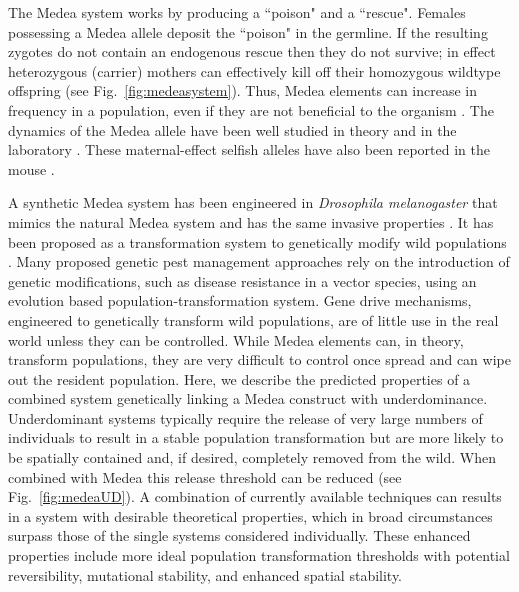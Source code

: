 \documentclass[oneside,11pt,a4paper]{book}
\begin{document}
%
The Medea system works by producing a ``poison" and a ``rescue".
Females possessing a Medea allele deposit the ``poison" in the germline.
If the resulting zygotes do not contain an endogenous rescue then they do not survive; in effect heterozygous (carrier) mothers can effectively kill off their homozygous wildtype offspring (see Fig.\ \ref{fig:medeasystem}).
Thus, Medea elements can increase in frequency in a population, even if they are not beneficial to the organism \citep{beeman:1992aa,wade:1994aa}.
The dynamics of the Medea allele have been well studied in theory and in the laboratory \citep{wade:1994aa,smith:1998aa}.
These maternal-effect selfish alleles have also been reported in the mouse \citep{peters:1993aa,weichenhan:1996aa}. 

A synthetic Medea system has been engineered in \textit{Drosophila melanogaster} that mimics the natural Medea system and has the same invasive properties \citep{chen:2007aa}.
It has been proposed as a transformation system to genetically modify wild populations \citep{chen:2007aa}.
Many proposed genetic pest management approaches rely on the introduction of genetic modifications, such as disease resistance in a vector species, using an evolution based population-transformation system.
Gene drive mechanisms, engineered to genetically transform wild populations, are of little use in the real world unless they can be controlled. 
While Medea elements can, in theory, transform populations, they are very difficult to control once spread and can wipe out the resident population.
Here, we describe the predicted properties of a combined system genetically linking a Medea construct with underdominance.
Underdominant systems typically require the release of very large numbers of individuals to result in a stable population transformation but are more likely to be spatially contained and, if desired, completely removed from the wild.
When combined with Medea this release threshold can be reduced (see Fig.\ \ref{fig:medeaUD}).
A combination of currently available techniques can results in a system with desirable theoretical properties, which in broad circumstances surpass those of the single systems considered individually.
These enhanced properties include more ideal population transformation thresholds with potential reversibility, mutational stability, and enhanced spatial stability.
\end{document}
